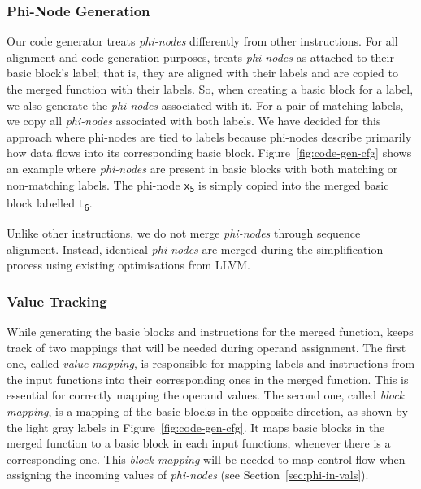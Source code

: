 \subsubsection{Phi-Node Generation}

Our code generator treats \textit{phi-nodes} differently from other instructions. For all alignment and code generation purposes,
{\ProjName} treats \textit{phi-nodes} as attached to their basic block's label; that is, they are aligned with their labels and are
copied to the merged function with their labels. So, when creating a basic block for a label, we also generate the \textit{phi-nodes}
associated with it. For a pair of matching labels, we copy all \textit{phi-nodes} associated with both labels.
We have decided for this approach where phi-nodes are tied to labels because phi-nodes describe primarily how data flows into its corresponding basic block.
Figure~\ref{fig:code-gen-cfg} shows an example where \textit{phi-nodes} are present in basic blocks
with both matching or non-matching labels.
The phi-node \texttt{x\textsubscript{5}} is simply copied into the merged basic block labelled \texttt{L\textsubscript{6}}.

Unlike other instructions, we do not merge \textit{phi-nodes} through sequence alignment.
Instead, identical \textit{phi-nodes} are merged during the simplification process
using existing optimisations from LLVM.

\subsubsection{Value Tracking}

While generating the basic blocks and instructions for the merged function,
{\ProjName} keeps track of two mappings that will be needed during operand assignment.
The first one, called \textit{value mapping}, is responsible for mapping labels
and instructions from the input functions into their corresponding ones in the merged
function.
This is essential for correctly mapping the operand values.
The second one, called \textit{block mapping}, is a mapping of the basic blocks
in the opposite direction, as shown by the light gray labels in Figure~\ref{fig:code-gen-cfg}.
It maps basic blocks in the merged function to a basic block in each input functions,
whenever there is a corresponding one.
This \textit{block mapping} will be needed to map control flow when assigning the
incoming values of \textit{phi-nodes} (see Section~\ref{sec:phi-in-vals}).

